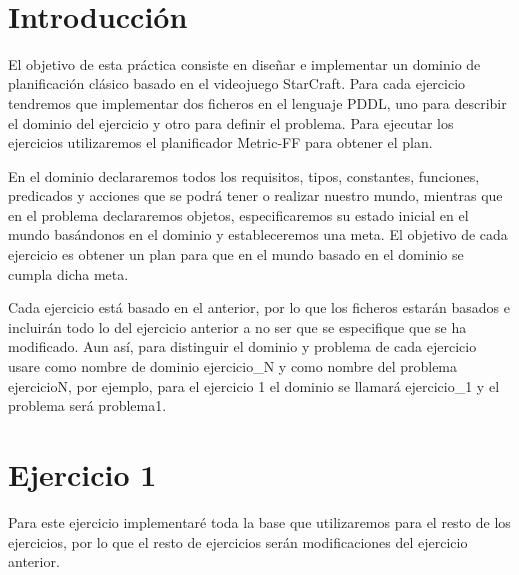 \documentclass[10pt, spanish]{article}
\makeatletter
\let\thedate\@date
\makeatother
\begin{document}
\begin{titlepage}
    {\large \thedate}\\[0.5cm]
    {\doclicenseThis}
 	
    \vfill
    
\end{titlepage}




\section*{Introducción}

El objetivo de esta práctica consiste en diseñar e implementar un dominio de planificación clásico basado en el videojuego StarCraft. Para cada ejercicio tendremos que implementar dos ficheros en el lenguaje PDDL, uno para describir el dominio del ejercicio y otro para definir el problema. Para ejecutar los ejercicios utilizaremos el planificador Metric-FF para obtener el plan.

En el dominio declararemos todos los requisitos, tipos, constantes, funciones, predicados y acciones que se podrá tener o realizar nuestro mundo, mientras que en el problema declararemos objetos, especificaremos su estado inicial en el mundo basándonos en el dominio y estableceremos una meta. El objetivo de cada ejercicio es obtener un plan para que en el mundo basado en el dominio se cumpla dicha meta.

Cada ejercicio está basado en el anterior, por lo que los ficheros estarán basados e incluirán todo lo del ejercicio anterior a no ser que se especifique que se ha modificado.  Aun así, para distinguir el dominio y problema de cada ejercicio usare como nombre de dominio ejercicio\_N y como nombre del problema ejercicioN, por ejemplo, para el ejercicio 1 el dominio se llamará ejercicio\_1 y el problema será problema1.

\section{Ejercicio 1}

Para este ejercicio implementaré toda la base que utilizaremos para el resto de los ejercicios, por lo que el resto de ejercicios serán modificaciones del ejercicio anterior. 
\end{document}
